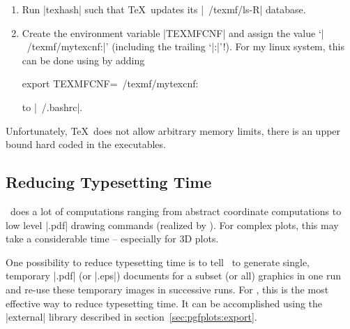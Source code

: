 {\begin{enumerate}
\begin{codeexample}[code only]
\end{codeexample}
	\item Run |texhash| such that \TeX\ updates its |~/texmf/ls-R| database.
	\item Create the environment variable |TEXMFCNF| and assign the value `|~/texmf/mytexcnf:|' (including the trailing `|:|'!). For my linux system, this can be done using by adding
\begin{codeexample}
export TEXMFCNF=~/texmf/mytexcnf:
\end{codeexample}
	to |~/.bashrc|.
\end{enumerate}

Unfortunately, \TeX\ does not allow arbitrary memory limits, there is an upper bound hard coded in the executables.

\subsection{Reducing Typesetting Time}
\PGFPlots\ does a lot of computations ranging from abstract coordinate computations to low level |.pdf| drawing commands (realized by \PGF). For complex plots, this may take a considerable time -- especially for 3D plots.

One possibility to reduce typesetting time is to tell \PGF\ to generate single, temporary |.pdf| (or |.eps|) documents for a subset (or all) graphics in one run and re-use these temporary images in successive runs. For \PGFPlots, this is the most effective way to reduce typesetting time. It can be accomplished using the |external| library described in section~\ref{sec:pgfplots:export}.
}
